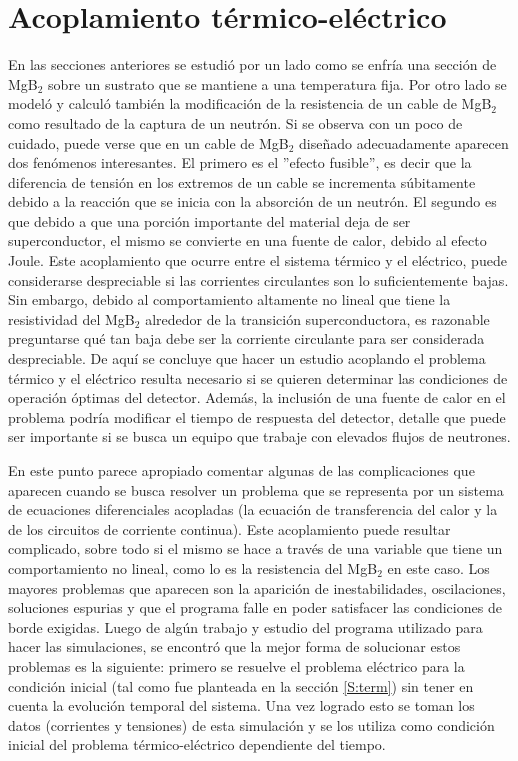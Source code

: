 \section{Acoplamiento térmico-eléctrico}\label{S:termyelec}
En las secciones anteriores se estudió por un lado como se enfría una sección de MgB$_2$ sobre un sustrato que se mantiene a una temperatura fija. Por otro lado se mo\-de\-ló y calculó también la modificación de la resistencia de un cable de MgB$_2$ como resultado de la captura de un neutrón. Si se observa con un poco de cuidado, puede verse que en un cable de MgB$_2$ diseñado adecuadamente aparecen dos fenómenos interesantes. El primero es el ''efecto fusible'', es decir que la diferencia de tensión en los extremos de un cable se incrementa súbitamente debido a la reacción que se inicia con la absorción de un neutrón. El segundo es que debido a que una porción importante del material deja de ser superconductor, el mismo se convierte en una fuente de calor, debido al efecto Joule. Este acoplamiento que ocurre entre el sistema térmico y el eléctrico, puede considerarse despreciable si las corrientes circulantes son lo suficientemente bajas. Sin embargo, debido al comportamiento altamente no lineal que tiene la resistividad del MgB$_2$ alrededor de la transición superconductora, es razonable preguntarse qué tan baja debe ser la corriente circulante para ser considerada despreciable. De aquí se concluye que hacer un estudio acoplando el problema térmico y el eléctrico resulta necesario si se quieren determinar las condiciones de operación óptimas del detector. Además, la inclusión de una fuente de calor en el problema podría modificar el tiempo de respuesta del detector, detalle que puede ser importante si se busca un equipo que trabaje con elevados flujos de neutrones.

En este punto parece apropiado comentar algunas de las complicaciones que aparecen cuando se busca resolver un problema que se representa por un sistema de ecuaciones diferenciales acopladas (la ecuación de transferencia del calor y la de los circuitos de corriente continua). Este acoplamiento puede resultar complicado, sobre todo si el mismo se hace a través de una variable que tiene un comportamiento no lineal, como lo es la resistencia del MgB$_2$ en este caso. Los mayores problemas que aparecen son la aparición de inestabilidades, oscilaciones, soluciones espurias y que el programa falle en poder satisfacer las condiciones de borde exigidas. Luego de algún trabajo y estudio del programa utilizado para hacer las simulaciones, se encontró que la mejor forma de solucionar estos problemas es la siguiente: primero se resuelve el problema eléctrico para la condición inicial (tal como fue planteada en la sección \ref{S:term}) sin tener en cuenta la evolución temporal del sistema. Una vez logrado esto se toman los datos (corrientes y tensiones) de esta simulación y se los utiliza como condición inicial del problema térmico-eléctrico dependiente del tiempo.

